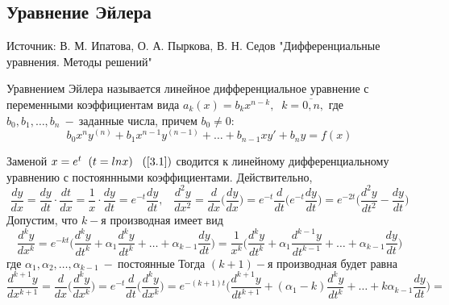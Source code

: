 \subsection{Уравнение Эйлера}
\begin{remark}
Источник: В. М. Ипатова, О. А. Пыркова, В. Н. Седов "Дифференциальные уравнения. Методы решений"
\end{remark}
\begin{definition}
Уравнением Эйлера называется линейное дифференциальное уравнение с переменными 
коэффициентам вида $a_k(x)=b_kx^{n-k}, \;\;k=\overline{0, n},$ где $b_0, b_1, \dots, b_n~-~$заданные числа, причем $b_0\neq 0:$
\begin{equation}
\tag{3.1}
\label{3.1}
    b_0x^ny^{(n)}+b_1x^{n-1}y^{(n-1)}+\dots+b_{n-1}xy'+b_ny=f(x)
\end{equation}
\end{definition}
Заменой $x=e^t\;\;(t=ln x)\;\;\;(\ref{3.1})$ сводится к линейному дифференциальному уравнению с постояннными коэффициентами. Действительно, $$\frac{dy}{dx}=\frac{dy}{dt}\cdot\frac{dt}{dx}=\frac{1}{x}\cdot \frac{dy}{dt}=e^{-t}\frac{dy}{dt}, \;\;\;\frac{d^2y}{dx^2}=\frac{d}{dx}\Big(\frac{dy}{dx}\Big)=e^{-t}\frac{d}{dt}\Big(e^{-t}\frac{dy}{dt}\Big)=e^{-2t}\Big(\frac{d^2y}{dt^2}-\frac{dy}{dt}\Big)$$
Допустим, что $k-$я производная имеет вид $$\frac{d^ky}{dx^k}=e^{-kt}\Big(\frac{d^ky}{dt^k}+\alpha_1\frac{d^ky}{dt^k}+\dots+\alpha_{k-1}\frac{dy}{dt}\Big)=\frac{1}{x^k}\Big(\frac{d^ky}{dt^k}+\alpha_1\frac{d^{k-1}y}{dt^{k-1}}+\dots+\alpha_{k-1}\frac{dy}{dt}\Big)$$ где $\alpha_1, \alpha_2, \dots, \alpha_{k-1}~-~\text{постоянные}$
Тогда $(k+1)-$я производная будет равна \begin{equation}
    \frac{d^{k+1}y}{dx^{k+1}}=\frac{d}{dx}\Big(\frac{d^ky}{dx^k}\Big)=e^{-t}\frac{d}{dt}\Big(\frac{d^ky}{dx^k}\Big)=e^{-(k+1)t}\Big(\frac{d^{k+1}y}{dt^{k+1}}+(\alpha_1-k)\frac{d^ky}{dt^k}+\dots+k\alpha_{k-1}\frac{dy}{dt}\Big) =
\end{equation}
    
